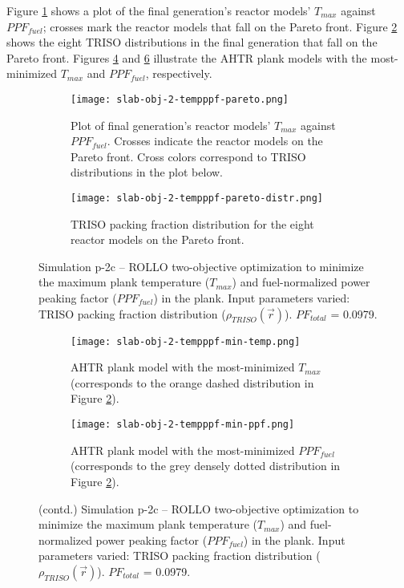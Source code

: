 Figure \ref{fig:slab-obj-2-tempppf-pareto} shows a plot of the final generation's 
reactor models' $T_{max}$ against $PPF_{fuel}$; crosses mark the reactor models that 
fall on the Pareto front.
Figure \ref{fig:slab-obj-2-tempppf-pareto-distr} shows the eight TRISO distributions in 
the final generation that fall on the Pareto front. 
Figures \ref{fig:slab-obj-2-tempppf-min-temp} and \ref{fig:slab-obj-2-tempppf-min-ppf} 
illustrate the \gls{AHTR} plank models with the most-minimized $T_{max}$ and 
$PPF_{fuel}$, respectively. 
\begin{figure}[htbp!]
    \centering
    \begin{subfigure}{\textwidth}
        \texttt{[image: slab-obj-2-tempppf-pareto.png]}
        \caption{Plot of final generation's reactor models' $T_{max}$ against 
        $PPF_{fuel}$. Crosses indicate the reactor models on the Pareto front.
        Cross colors correspond to TRISO distributions in the plot below.}
        \label{fig:slab-obj-2-tempppf-pareto} 
    \end{subfigure}
    \begin{subfigure}{\textwidth}
        \texttt{[image: slab-obj-2-tempppf-pareto-distr.png]}
        \caption{TRISO packing fraction distribution for the eight reactor models on the 
        Pareto front.}
        \label{fig:slab-obj-2-tempppf-pareto-distr} 
    \end{subfigure}
    \caption{Simulation p-2c -- ROLLO two-objective optimization to minimize the 
    maximum plank temperature ($T_{max}$) and fuel-normalized power peaking factor 
    ($PPF_{fuel}$) in the plank. 
    Input parameters varied: TRISO packing fraction distribution 
    ($\rho_{TRISO}(\vec{r})$). $PF_{total}$ = 0.0979.}
    \label{fig:slab-obj-2-tempppf}
\end{figure}
\begin{figure}[htbp!]
    \ContinuedFloat
    \begin{subfigure}{\textwidth}
        \texttt{[image: slab-obj-2-tempppf-min-temp.png]}
        \caption{\gls{AHTR} plank model with the most-minimized $T_{max}$
        (corresponds to the orange dashed distribution in Figure 
        \ref{fig:slab-obj-2-tempppf-pareto-distr}).}
        \label{fig:slab-obj-2-tempppf-min-temp} 
    \end{subfigure}
    \begin{subfigure}{\textwidth}
        \texttt{[image: slab-obj-2-tempppf-min-ppf.png]}
        \caption{\gls{AHTR} plank model with the most-minimized $PPF_{fuel}$
        (corresponds to the grey densely dotted distribution in Figure 
        \ref{fig:slab-obj-2-tempppf-pareto-distr}).}
        \label{fig:slab-obj-2-tempppf-min-ppf} 
    \end{subfigure}
    \caption{(contd.) Simulation p-2c -- ROLLO two-objective optimization to minimize 
    the maximum plank temperature ($T_{max}$) and fuel-normalized power peaking factor 
    ($PPF_{fuel}$) in the plank. 
    Input parameters varied: TRISO packing fraction distribution 
    ($\rho_{TRISO}(\vec{r})$). $PF_{total}$ = 0.0979.}
\end{figure}

